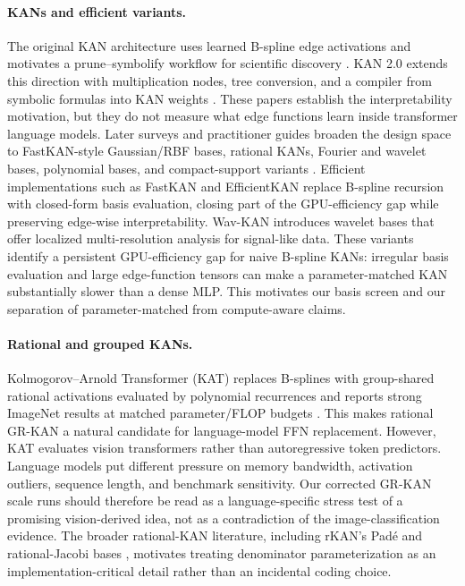 \documentclass[11pt]{article}
\newcommand{\modelname}[1]{\textsc{#1}}
\newcommand{\grkan}{\modelname{GR-KAN}}
\begin{document}
\paragraph{KANs and efficient variants.}
The original KAN architecture uses learned B-spline edge activations and motivates a prune--symbolify workflow for scientific discovery \cite{liu2024kan}. KAN 2.0 extends this direction with multiplication nodes, tree conversion, and a compiler from symbolic formulas into KAN weights \cite{liu2024kan2}. These papers establish the interpretability motivation, but they do not measure what edge functions learn inside transformer language models. Later surveys and practitioner guides broaden the design space to FastKAN-style Gaussian/RBF bases, rational KANs, Fourier and wavelet bases, polynomial bases, and compact-support variants \cite{somvanshi2024survey,noorizadegan2025practitioners}. Efficient implementations such as FastKAN \cite{li2024fastkan} and EfficientKAN \cite{blealtan2024efficientkan} replace B-spline recursion with closed-form basis evaluation, closing part of the GPU-efficiency gap while preserving edge-wise interpretability. Wav-KAN \cite{bozorgasl2024wavkan} introduces wavelet bases that offer localized multi-resolution analysis for signal-like data. These variants identify a persistent GPU-efficiency gap for naive B-spline KANs: irregular basis evaluation and large edge-function tensors can make a parameter-matched KAN substantially slower than a dense MLP. This motivates our basis screen and our separation of parameter-matched from compute-aware claims.

\paragraph{Rational and grouped KANs.}
Kolmogorov--Arnold Transformer (KAT) replaces B-splines with group-shared rational activations evaluated by polynomial recurrences and reports strong ImageNet results at matched parameter/FLOP budgets \cite{yang2024kat}. This makes rational \grkan{} a natural candidate for language-model FFN replacement. However, KAT evaluates vision transformers rather than autoregressive token predictors. Language models put different pressure on memory bandwidth, activation outliers, sequence length, and benchmark sensitivity. Our corrected \grkan{} scale runs should therefore be read as a language-specific stress test of a promising vision-derived idea, not as a contradiction of the image-classification evidence. The broader rational-KAN literature, including rKAN's Pad\'{e} and rational-Jacobi bases \cite{aghaei2024rkan}, motivates treating denominator parameterization as an implementation-critical detail rather than an incidental coding choice.
\end{document}
